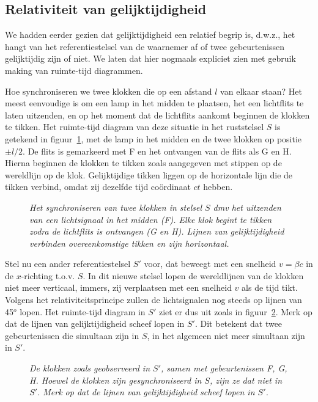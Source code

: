 \subsection{Relativiteit van gelijktijdigheid}
We hadden eerder gezien dat gelijktijdigheid een relatief begrip is,
d.w.z., het hangt van het referentiestelsel van de waarnemer af of
twee gebeurtenissen gelijktijdig zijn of niet. We laten dat hier nogmaals
expliciet zien met gebruik making van ruimte-tijd diagrammen.

Hoe synchroniseren we twee klokken die op een afstand $l$ van elkaar
staan? Het meest eenvoudige is om een lamp in het midden te plaatsen,
het een lichtflits te laten uitzenden, en op het moment dat de
lichtflits aankomt beginnen de klokken te tikken. Het ruimte-tijd
diagram van deze situatie in het ruststelsel $S$ is getekend in
figuur~\ref{f:sync}, met de lamp in het midden en de twee klokken op
positie $\pm l/2$. De flits is gemarkeerd met F en het ontvangen van
de flits als G en H. Hierna beginnen de klokken te tikken zoals
aangegeven met stippen op de wereldlijn op de klok. Gelijktijdige
tikken liggen op de horizontale lijn die de tikken verbind, omdat zij
dezelfde tijd co\"ordinaat $ct$ hebben.

\begin{figure}[ht] 
\centering
\caption{{\sl Het synchroniseren van twee klokken in stelsel $S$ dmv
het uitzenden van een lichtsignaal in het midden (F).  Elke klok
begint te tikken zodra de lichtflits is ontvangen (G en H). Lijnen van
gelijktijdigheid verbinden overeenkomstige tikken en zijn
horizontaal. \label{f:sync}}}
\end{figure}

Stel nu een ander referentiestelsel $S'$ voor, dat beweegt met een
snelheid $v=\beta c$ in de $x$-richting t.o.v. $S$.  In dit nieuwe
stelsel lopen de wereldlijnen van de klokken niet meer verticaal,
immers, zij verplaatsen met een snelheid $v$ als de tijd tikt. Volgens
het relativiteitsprincipe zullen de lichtsignalen nog steeds op lijnen
van 45$^o$ lopen. Het ruimte-tijd diagram in $S'$ ziet er dus uit
zoals in figuur~\ref{f:sync2}. Merk op dat de lijnen van
gelijktijdigheid scheef lopen in $S'$. Dit betekent dat twee
gebeurtenissen die simultaan zijn in $S$, in het algemeen niet meer
simultaan zijn in $S'$.

\begin{figure}[htb] 
\centering
\caption{{\sl De klokken zoals geobserveerd in $S'$, samen met
gebeurtenissen F, G, H. Hoewel de klokken zijn gesynchroniseerd in
$S$, zijn ze dat niet in $S'$. Merk op dat de lijnen van
gelijktijdigheid scheef lopen in $S'$.\label{f:sync2} }}
\end{figure}

